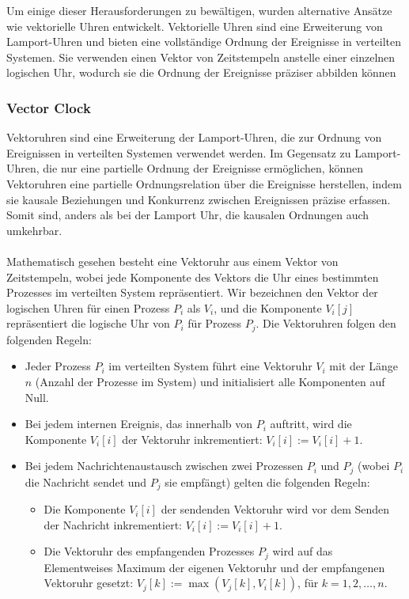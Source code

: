 Um einige dieser Herausforderungen zu bewältigen, wurden alternative Ansätze wie vektorielle Uhren entwickelt. Vektorielle Uhren sind eine Erweiterung von Lamport-Uhren und bieten eine vollständige Ordnung der Ereignisse in verteilten Systemen. Sie verwenden einen Vektor von Zeitstempeln anstelle einer einzelnen logischen Uhr, wodurch sie die Ordnung der Ereignisse präziser abbilden können

\subsubsection{Vector Clock}
Vektoruhren sind eine Erweiterung der Lamport-Uhren, die zur Ordnung von Ereignissen in verteilten Systemen verwendet werden. Im Gegensatz zu Lamport-Uhren, die nur eine partielle Ordnung der Ereignisse ermöglichen, können Vektoruhren eine partielle Ordnungsrelation  über die Ereignisse herstellen, indem sie kausale Beziehungen und Konkurrenz zwischen Ereignissen präzise erfassen. Somit sind, anders als bei der Lamport Uhr, die kausalen Ordnungen auch umkehrbar.
\\\\
Mathematisch gesehen besteht eine Vektoruhr aus einem Vektor von Zeitstempeln, wobei jede Komponente des Vektors die Uhr eines bestimmten Prozesses im verteilten System repräsentiert. Wir bezeichnen den Vektor der logischen Uhren für einen Prozess $P_i$ als $V_i$, und die Komponente $V_i[j]$ repräsentiert die logische Uhr von $P_i$ für Prozess $P_j$. Die Vektoruhren folgen den folgenden Regeln:
\begin{itemize}
\item Jeder Prozess $P_i$ im verteilten System führt eine Vektoruhr $V_i$ mit der Länge $n$ (Anzahl der Prozesse im System) und initialisiert alle Komponenten auf Null.

\item Bei jedem internen Ereignis, das innerhalb von $P_i$ auftritt, wird die Komponente $V_i[i]$ der Vektoruhr inkrementiert: $V_i[i] := V_i[i] + 1$.

\item Bei jedem Nachrichtenaustausch zwischen zwei Prozessen $P_i$ und $P_j$ (wobei $P_i$ die Nachricht sendet und $P_j$ sie empfängt) gelten die folgenden Regeln:
\begin{itemize}
\item Die Komponente $V_i[i]$ der sendenden Vektoruhr wird vor dem Senden der Nachricht inkrementiert: $V_i[i] := V_i[i] + 1$.
\item Die Vektoruhr des empfangenden Prozesses $P_j$ wird auf das Elementweises Maximum der eigenen Vektoruhr und der empfangenen Vektoruhr gesetzt: $V_j[k] := \max(V_j[k], V_i[k])$, für $k = 1, 2, \dots, n$.
\end{itemize}
\end{itemize}	
